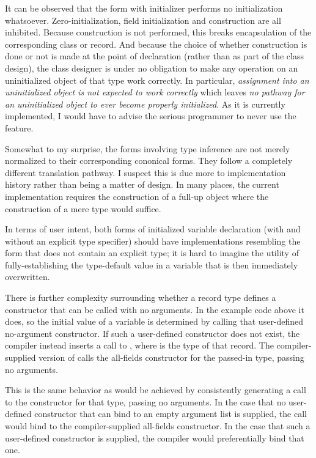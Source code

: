 It can be observed that the form with  initializer performs no
initialization whatsoever.  Zero-initialization, field initialization and construction are
all inhibited.  Because construction is not performed, this breaks encapsulation of the
corresponding class or record.  And because the choice of whether construction is done or
not is made at the point of declaration (rather than as part of the class design), the
class designer is under no obligation to make any operation on an uninitialized object of
that type work correctly.  In particular, \emph{assignment into an uninitialized object is
  not expected to work correctly} which leaves \emph{no pathway for an uninitialized
  object to ever become properly initialized}.  As it is currently implemented, I would
have to advise the serious programmer to never use the  feature.

Somewhat to my surprise, the forms involving type inference are not merely normalized
to their corresponding cononical forms.  They follow a completely different translation
pathway.  I suspect this is due more to implementation history rather than being a matter
of design.  In many places, the current implementation requires the construction of a
full-up object where the construction of a mere type would suffice.  

In terms of user intent, both forms of initialized variable declaration (with and without
an explicit type specifier) should have implementations resembling the
form that does not contain an explicit type; it is hard to imagine the utility of
fully-establishing the type-default value in a variable that is then immediately overwritten.

There is further complexity surrounding whether a record type defines a constructor that
can be called with no arguments.  In the example code above it does, so the initial value of
a  variable is determined by calling that user-defined no-argument
constructor.  If such a user-defined constructor does not exist, the compiler instead
inserts a call to , where  is the type of that record.  The
compiler-supplied version of  calls the all-fields constructor for the
passed-in type, passing no arguments.  

This is the same behavior as would be achieved by consistently generating a call to the
constructor for that type, passing no arguments.  In the case that no user-defined
constructor that can bind to an empty argument list is supplied, the call would bind to
the compiler-supplied all-fields constructor.  In the case that such a user-defined
constructor is supplied, the compiler would preferentially bind that one.

